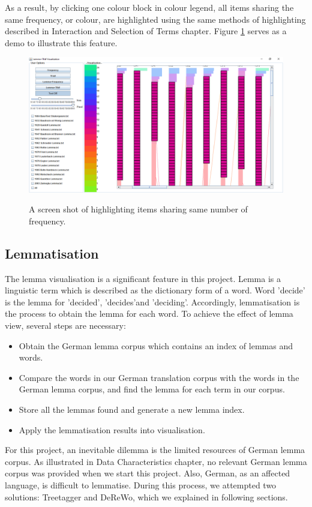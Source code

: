 As a result, by clicking one colour block in colour legend, all items sharing the same frequency, or colour, are highlighted using the same methods of highlighting described in Interaction and Selection of Terms chapter. Figure \ref{fig:interactiveColourMapping} serves as a demo to illustrate this feature.
\begin{figure}[H]
	\centering	
	\includegraphics[scale=0.5]{Figs/Colour-Legend-Interation}\\[1ex]
	\caption{A screen shot of highlighting items sharing same number of frequency.}
	\label{fig:interactiveColourMapping}
\end{figure} 

\subsection{Lemmatisation}

The lemma visualisation is a significant feature in this project. Lemma is a linguistic term which is described as the dictionary form of a word. Word 'decide' is the lemma for 'decided', 'decides'and 'deciding'. Accordingly, lemmatisation is the process to obtain the lemma for each word. To achieve the effect of lemma view, several steps are necessary:
\begin{itemize}
	\item \textbf{} Obtain the German lemma corpus which contains an index of lemmas and words.
	\item \textbf{} Compare the words in our German translation corpus with the words in the German lemma corpus, and find the lemma for each term in our corpus.
	\item \textbf{} Store all the lemmas  found and generate a new lemma index.
	\item \textbf{} Apply the lemmatisation results into visualisation.
\end{itemize}
For this project, an inevitable dilemma is the limited resources of German lemma corpus. As illustrated in Data Characteristics chapter, no relevant German lemma corpus was provided when we start this project. Also, German, as an affected language, is difficult to lemmatise. During this process, we attempted two solutions: Treetagger and DeReWo, which we explained in following sections.

